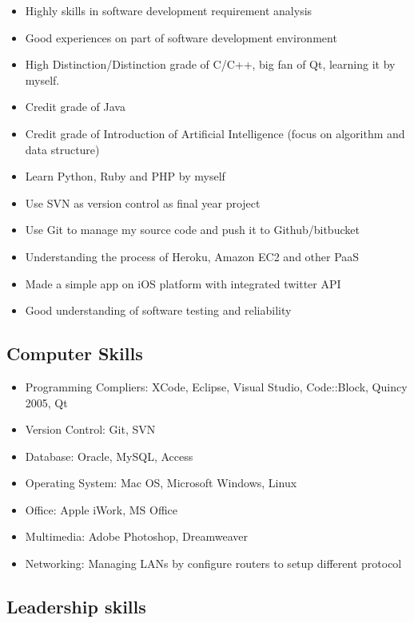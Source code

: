\documentclass{res}
\begin{document}
\begin{resume}
	\begin{itemize}
	\item Highly skills in software development requirement analysis
	\item Good experiences on part of software development environment
	\item High Distinction/Distinction grade of C/C++, big fan of Qt, learning it by myself.
	\item Credit grade of Java
	\item Credit grade of Introduction of Artificial Intelligence (focus on algorithm and data structure)
	\item Learn Python, Ruby and PHP by myself
	\item Use SVN as version control as final year project
	\item Use Git to manage my source code and push it to Github/bitbucket
	\item Understanding the process of Heroku, Amazon EC2 and other PaaS
	\item Made a simple app on iOS platform with integrated twitter API
	\item Good understanding of software testing and reliability
	\end{itemize}

\subsection{Computer Skills}
	\begin{itemize}
	\item Programming Compliers: XCode, Eclipse, Visual Studio, Code::Block, Quincy 2005, Qt
	\item Version Control: Git, SVN
	\item Database: Oracle, MySQL, Access
	\item Operating System: Mac OS, Microsoft Windows, Linux
	\item Office: Apple iWork, MS Office
	\item Multimedia: Adobe Photoshop, Dreamweaver
	\item Networking: Managing LANs by configure routers to setup different protocol
	\end{itemize}

\subsection{Leadership skills}
	

\end{resume}
\end{document}
